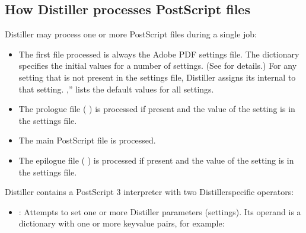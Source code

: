 \documentclass[letterpaper,12pt,english,openany,oneside]{sphinxmanual}
\begin{document}
\subsection{How Distiller processes PostScript files}
\label{\detokenize{index:how-distiller-processes-postscript-files}}
Distiller may process one or more PostScript files during a single job:
\begin{itemize}
\item {} 
The first file processed is always the Adobe PDF settings file. The  dictionary specifies the initial values for a number of settings. (See  for details.) For any setting that is not present in the settings file, Distiller assigns its internal  to that setting. ,” lists the default values for all settings.

\item {} 
The prologue file ( ) is processed if present and the value of the  setting is  in the settings file.

\item {} 
The main PostScript file is processed.

\item {} 
The epilogue file ( ) is processed if present and the value of the  setting is  in the settings file.

\end{itemize}

Distiller contains a PostScript 3 interpreter with two Distiller\sphinxhyphen{}specific operators:
\begin{itemize}
\item {} 
 : Attempts to set one or more Distiller parameters (settings). Its operand is a dictionary with one or more key\sphinxhyphen{}value pairs, for example:

\end{itemize}

\begin{sphinxVerbatim}[commandchars=\\\{\}]
  
\end{sphinxVerbatim}
\end{document}
